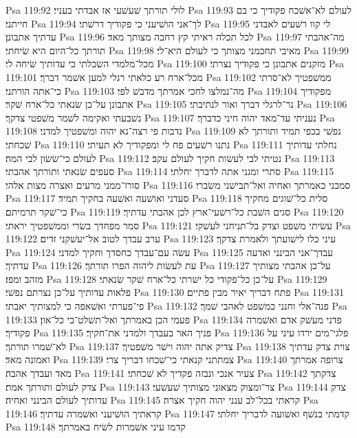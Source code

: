 Psa 119:92  לולי תורתך שׁעשׁעי אז אבדתי בעניי׃
Psa 119:93  לעולם לא־אשׁכח פקודיך כי בם חייתני׃
Psa 119:94  לך־אני הושׁיעני כי פקודיך דרשׁתי׃
Psa 119:95  לי קוו רשׁעים לאבדני עדתיך אתבונן׃
Psa 119:96  לכל תכלה ראיתי קץ רחבה מצותך מאד׃
Psa 119:97  מה־אהבתי תורתך כל־היום היא שׂיחתי׃
Psa 119:98  מאיבי תחכמני מצותך כי לעולם היא־לי׃
Psa 119:99  מכל־מלמדי השׂכלתי כי עדותיך שׂיחה לי׃
Psa 119:100  מזקנים אתבונן כי פקודיך נצרתי׃
Psa 119:101  מכל־ארח רע כלאתי רגלי למען אשׁמר דברך׃
Psa 119:102  ממשׁפטיך לא־סרתי כי־אתה הורתני׃
Psa 119:103  מה־נמלצו לחכי אמרתך מדבשׁ לפי׃
Psa 119:104  מפקודיך אתבונן על־כן שׂנאתי כל־ארח שׁקר׃
Psa 119:105  נר־לרגלי דברך ואור לנתיבתי׃
Psa 119:106  נשׁבעתי ואקימה לשׁמר משׁפטי צדקך׃
Psa 119:107  נעניתי עד־מאד יהוה חיני כדברך׃
Psa 119:108  נדבות פי רצה־נא יהוה ומשׁפטיך למדני׃
Psa 119:109  נפשׁי בכפי תמיד ותורתך לא שׁכחתי׃
Psa 119:110  נתנו רשׁעים פח לי ומפקודיך לא תעיתי׃
Psa 119:111  נחלתי עדותיך לעולם כי־שׂשׂון לבי המה׃
Psa 119:112  נטיתי לבי לעשׂות חקיך לעולם עקב׃
Psa 119:113  סעפים שׂנאתי ותורתך אהבתי׃
Psa 119:114  סתרי ומגני אתה לדברך יחלתי׃
Psa 119:115  סורו־ממני מרעים ואצרה מצות אלהי׃
Psa 119:116  סמכני כאמרתך ואחיה ואל־תבישׁני משׂברי׃
Psa 119:117  סעדני ואושׁעה ואשׁעה בחקיך תמיד׃
Psa 119:118  סלית כל־שׁוגים מחקיך כי־שׁקר תרמיתם׃
Psa 119:119  סגים השׁבת כל־רשׁעי־ארץ לכן אהבתי עדתיך׃
Psa 119:120  סמר מפחדך בשׂרי וממשׁפטיך יראתי׃
Psa 119:121  עשׂיתי משׁפט וצדק בל־תניחני לעשׁקי׃
Psa 119:122  ערב עבדך לטוב אל־יעשׁקני זדים׃
Psa 119:123  עיני כלו לישׁועתך ולאמרת צדקך׃
Psa 119:124  עשׂה עם־עבדך כחסדך וחקיך למדני׃
Psa 119:125  עבדך־אני הבינני ואדעה עדתיך׃
Psa 119:126  עת לעשׂות ליהוה הפרו תורתך׃
Psa 119:127  על־כן אהבתי מצותיך מזהב ומפז׃
Psa 119:128  על־כן כל־פקודי כל ישׁרתי כל־ארח שׁקר שׂנאתי׃
Psa 119:129  פלאות עדותיך על־כן נצרתם נפשׁי׃
Psa 119:130  פתח דבריך יאיר מבין פתיים׃
Psa 119:131  פי־פערתי ואשׁאפה כי למצותיך יאבתי׃
Psa 119:132  פנה־אלי וחנני כמשׁפט לאהבי שׁמך׃
Psa 119:133  פעמי הכן באמרתך ואל־תשׁלט־בי כל־און׃
Psa 119:134  פדני מעשׁק אדם ואשׁמרה פקודיך׃
Psa 119:135  פניך האר בעבדך ולמדני את־חקיך׃
Psa 119:136  פלגי־מים ירדו עיני על לא־שׁמרו תורתך׃
Psa 119:137  צדיק אתה יהוה וישׁר משׁפטיך׃
Psa 119:138  צוית צדק עדתיך ואמונה מאד׃
Psa 119:139  צמתתני קנאתי כי־שׁכחו דבריך צרי׃
Psa 119:140  צרופה אמרתך מאד ועבדך אהבה׃
Psa 119:141  צעיר אנכי ונבזה פקדיך לא שׁכחתי׃
Psa 119:142  צדקתך צדק לעולם ותורתך אמת׃
Psa 119:143  צר־ומצוק מצאוני מצותיך שׁעשׁעי׃
Psa 119:144  צדק עדותיך לעולם הבינני ואחיה׃
Psa 119:145  קראתי בכל־לב ענני יהוה חקיך אצרה׃
Psa 119:146  קראתיך הושׁיעני ואשׁמרה עדתיך׃
Psa 119:147  קדמתי בנשׁף ואשׁועה לדבריך יחלתי׃
Psa 119:148  קדמו עיני אשׁמרות לשׂיח באמרתך׃
